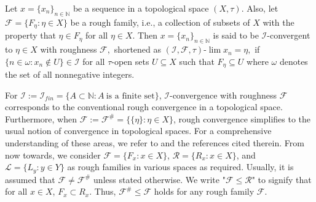 \documentclass[11pt]{amsart}
\begin{document}
    \begin{definition}
         Let $x=\{x_n\}_{n\in \mathbb{N}}$ be a sequence in a topological space $(X, \tau).$ Also, let $\mathscr{F}= \{F_\eta: \eta\in X\}$ be a rough family, i.e., a collection of subsets of $X$ with the property that $\eta \in F_\eta$ for all $\eta\in X.$ Then $x=\{x_n\}_{n\in \mathbb{N}}$ is said to be $\mathcal{I}$-convergent to $\eta \in X$ with roughness $\mathscr{F},$ shortened as $(\mathcal{I}, \mathscr{F}, \tau)$-$\lim x_n = \eta,$ if $\{n \in \omega : x_n \notin U\}\in\mathcal{I}$ for all $\tau$-open sets $U \subseteq X$ such that $F_\eta\subseteq U$ where $\omega$ denotes the set of all nonnegative integers.              
    \end{definition}
    For $\mathcal{I}:=\mathcal{I}_{fin}=\{A\subset\mathbb{N}: A~\text{is a finite set}\}$, $\mathcal{I}$-convergence with roughness $\mathscr{F}$ corresponds to the conventional rough convergence in a topological space. Furthermore, when $\mathscr{F}:=\mathscr{F^\#}=\{\{\eta\}: \eta\in X\}$, rough convergence simplifies to the usual notion of convergence in topological spaces. For a comprehensive understanding of these areas, we refer to \cite{Leonetti2023, Leonetti2026} and the references cited therein. From now towards, we consider $\mathscr{F}=\{F_x: x\in X\}$, $\mathscr{R}=\{R_x: x\in X\}$, and $\mathscr{L}=\{L_y:y\in Y\}$ as rough families in various spaces as required. Usually, it is assumed that $\mathscr{F} \neq \mathscr{F^\#}$ unless stated otherwise. We write "$\mathscr{F}\leq \mathscr{R}$" to signify that for all $x\in X$, $F_x\subset R_x$. Thus, $\mathscr{F}^\#\leq \mathscr{F}$ holds for any rough family $\mathscr{F}$.\\
    
\end{document}
